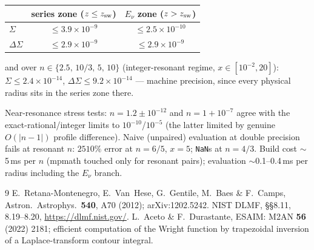 \documentclass{article}
\begin{document}
\begin{center}
\begin{tabular}{lcc}
\toprule
 & series zone ($z\le z_{\rm sw}$) & $E_\nu$ zone ($z>z_{\rm sw}$)\\
\midrule
$\Sigma$ & $\le 3.9\times10^{-9}$ & $\le 2.5\times10^{-10}$\\
$\Delta\Sigma$ & $\le 2.9\times10^{-9}$ & $\le 2.9\times10^{-9}$\\
\bottomrule
\end{tabular}
\end{center}

\noindent and over $n\in\{2.5,\,10/3,\,5,\,10\}$ (integer-resonant regime,
$x\in[10^{-2},20]$): $\Sigma\le2.4\times10^{-14}$,
$\Delta\Sigma\le9.2\times10^{-14}$ --- machine precision, since every
physical radius sits in the series zone there.

\noindent Near-resonance stress tests: $n = 1.2\pm10^{-12}$ and
$n=1+10^{-7}$ agree with the exact-rational/integer limits to
$10^{-10}$/$10^{-5}$ (the latter limited by genuine $O(|n-1|)$ profile
difference). Naive (unpaired) evaluation at double precision fails at
resonant $n$: $2510\%$ error at $n=6/5$, $x=5$; \texttt{NaN}s at $n=4/3$.
Build cost $\sim$5\,ms per $n$ (mpmath touched only for resonant pairs);
evaluation $\sim$0.1--0.4\,ms per radius including the $E_\nu$ branch.

\begin{thebibliography}{9}
E.~Retana-Montenegro, E.~Van~Hese, G.~Gentile, M.~Baes \& F.~Camps,
Astron.\ Astrophys.\ \textbf{540}, A70 (2012); arXiv:1202.5242.
NIST DLMF, \S\S8.11, 8.19--8.20, \url{https://dlmf.nist.gov/}.
L.~Aceto \& F.~Durastante, ESAIM: M2AN \textbf{56} (2022) 2181;
efficient computation of the Wright function by trapezoidal inversion of
a Laplace-transform contour integral.
\end{thebibliography}
\end{document}
